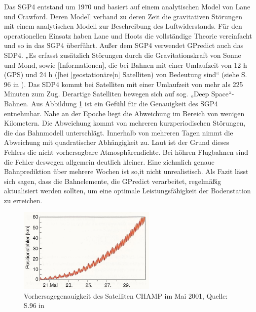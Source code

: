 Das \ac{SGP4} entstand um 1970 und basiert auf einem analytischen Model von Lane und Crawford. Deren Modell verband zu deren Zeit die gravitativen Störungen mit einem analytischen Modell zur Beschreibung des Luftwiderstands. Für den operationellen Einsatz haben Lane und Hoots die vollständige Theorie vereinfacht und so in das \ac{SGP4} überführt. 
\newpar
Außer dem \ac{SGP4} verwendet  GPredict auch das \ac{SDP4}. „Es erfasst zusätzlich Störungen durch die Gravitationskraft von Sonne und Mond, sowie [Informationen], die bei Bahnen mit einer Umlaufzeit von 12 h (GPS) und 24 h ([bei ]geostationäre[n] Satelliten) von Bedeutung sind“ (siehe S. 96 in \cite{HandRaum}). Das \ac{SDP4} kommt bei Satelliten mit einer Umlaufzeit von mehr als 225 Minuten zum Zug. Derartige Satelliten bewegen sich auf sog. „Deep Space“-Bahnen. 
\newpar
Aus Abbildung \ref{fig:sgp4} ist ein Gefühl für die Genauigkeit des \ac{SGP4} entnehmbar. Nahe an der Epoche liegt die Abweichung im Bereich von wenigen Kilometern. Die Abweichung kommt von mehreren kurzperiodischen Störungen, die das Bahnmodell unterschlägt. Innerhalb von mehreren Tagen nimmt die Abweichung mit quadratischer Abhängigkeit zu. Laut \cite{HandRaum} ist der Grund dieses Fehlers die nicht vorhersagbare Atmosphärendichte. Bei höhren Flugbahnen sind die Fehler deswegen allgemein deutlich kleiner. Eine ziehmlich genaue Bahnprediktion über mehrere Wochen ist so,it nicht unrealistisch. Als Fazit lässt sich sagen, dass die Bahnelemente, die GPredict verarbeitet, regelmäßig aktualisiert werden sollten, um eine optimale Leistungsfähigkeit der Bodenstation zu erreichen.  
\begin{figure}[h]                                                                           %
	\centering                                                                            	%
	\includegraphics[width=0.6\textwidth]{./images/sgp4_error.jpg}              			%
	\caption[Vorhersagegenauigkeit]{Vorhersagegenauigkeit des Satelliten CHAMP 
	im Mai 2001, Quelle: S.96 in \cite{HandRaum}}                        					%
	\label{fig:sgp4}                                                                        %
\end{figure}                                                                              	%

